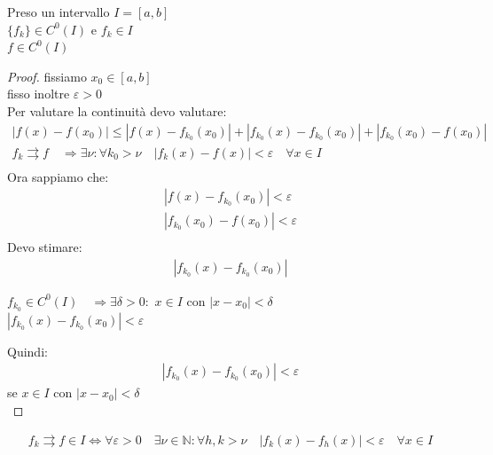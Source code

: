 \documentclass[a4paper, oneside]{article}
\begin{document}
\begin{theorem}
  Preso un intervallo $I = [a,b]$\\
   $\{f_k\} \in C^0 (I)$ e $f_k \in I$\\
   $f \in C^0 (I)$
\end{theorem}
\begin{proof}
  fissiamo $x_0 \in [a,b]$\\
  fisso inoltre $\varepsilon > 0$\\
  Per valutare la continuità devo valutare:
  \begin{gather*}
    \left\lvert f(x) - f(x_0) \right\rvert \leq \left\lvert f(x) - f_{k_0}(x_0)\right\rvert + \left\lvert f_{k_0}(x) - f_{k_0}(x_0) \right\rvert + \left\lvert f_{k_0}(x_0) - f(x_0) \right\rvert   \\
    f_k \rightrightarrows f \quad \Rightarrow \exists \nu : \forall k_0 > \nu \quad \left\lvert f_k(x) - f(x) \right\rvert < \varepsilon \quad \forall x \in I\\
  \end{gather*}
  Ora sappiamo che:
  \begin{gather*}
    \left\lvert f(x) - f_{k_0}(x_0)\right\rvert < \varepsilon \\
    \left\lvert f_{k_0}(x_0) - f(x_0) \right\rvert < \varepsilon \\
  \end{gather*}
  Devo stimare:
  \begin{gather*}
    \left\lvert f_{k_0}(x) - f_{k_0}(x_0) \right\rvert
  \end{gather*}
  \begin{observation}
      $f_{k_0} \in C^0 (I) \quad \Rightarrow \exists \delta > 0 :$  $x \in I \text{ con } |x-x_0| < \delta$\\
       $| f_{k_0}(x) - f_{k_0}(x_0) | < \varepsilon$
  \end{observation}
  Quindi:
  \begin{gather*}
    |f_{k_0}(x) - f_{k_0}(x_0)| < \varepsilon
  \end{gather*}
  se $x \in I $ con $|x-x_0| < \delta$\\
\end{proof}

\begin{theorem}
  \begin{gather*}
    f_k \rightrightarrows f \in I \Leftrightarrow \forall \varepsilon > 0 \quad \exists \nu \in \mathbb{N} : \forall h,k > \nu \quad \left\lvert f_k(x) - f_h(x) \right\rvert < \varepsilon \quad \forall x \in I
  \end{gather*}
\end{theorem}
\end{document}
